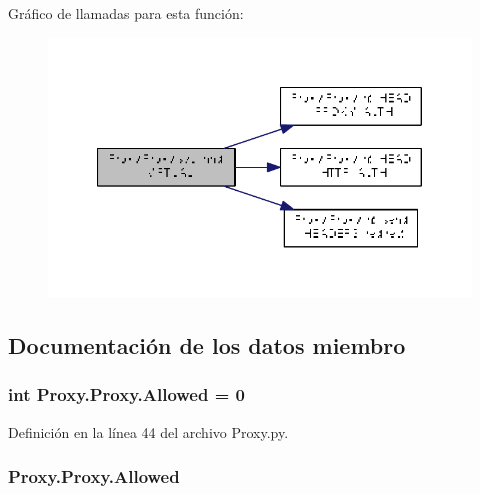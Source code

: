 Gráfico de llamadas para esta función\-:\nopagebreak
\begin{figure}[H]
\begin{center}
\leavevmode
\includegraphics[width=340pt]{class_proxy_1_1_proxy_a722a6a583213ef2b5ed1f9b351a98ff0_cgraph}
\end{center}
\end{figure}




\subsection{Documentación de los datos miembro}
\hypertarget{class_proxy_1_1_proxy_ac74831cde9a7ad2ebb39d6ef92d5aaf6}{
\subsubsection[{Allowed}]{\setlength{\rightskip}{0pt plus 5cm}int Proxy.\-Proxy.\-Allowed = 0\hspace{0.3cm}{\ttfamily [static]}}}\label{class_proxy_1_1_proxy_ac74831cde9a7ad2ebb39d6ef92d5aaf6}


Definición en la línea 44 del archivo Proxy.\-py.

\hypertarget{class_proxy_1_1_proxy_abb25fa16c6d4a74eaf353de545a7f1ed}{
\subsubsection[{Allowed}]{\setlength{\rightskip}{0pt plus 5cm}Proxy.\-Proxy.\-Allowed}}\label{class_proxy_1_1_proxy_abb25fa16c6d4a74eaf353de545a7f1ed}


